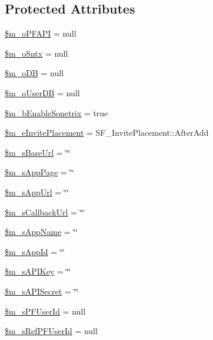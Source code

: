 \subsection*{Protected Attributes}
\begin{DoxyCompactItemize}
\item 
\hyperlink{classSF__AppConfig_a23d5b5190ee32c4eb8fff028844b1fa6}{\$m\_\-oPFAPI} = null
\item 
\hyperlink{classSF__AppConfig_a22d1091f94c58e3533304abe3eb9e9fe}{\$m\_\-oSntx} = null
\item 
\hyperlink{classSF__AppConfig_af0fd242fc474881efab473522eec0748}{\$m\_\-oDB} = null
\item 
\hyperlink{classSF__AppConfig_a480a834e33015cc9a001d1d84972bb12}{\$m\_\-oUserDB} = null
\item 
\hyperlink{classSF__AppConfig_a55534a049a693ced372dba4331e5e9bd}{\$m\_\-bEnableSonetrix} = true
\item 
\hyperlink{classSF__AppConfig_a78a5b97e38e7a2bc9e36cca0a97a2cca}{\$m\_\-eInvitePlacement} = SF\_\-InvitePlacement::AfterAdd
\item 
\hyperlink{classSF__AppConfig_a12f1f6a87e26bffa94c2b7e5ea3885c9}{\$m\_\-sBaseUrl} = \char`\"{}\char`\"{}
\item 
\hyperlink{classSF__AppConfig_ae9ca918bbe92c641557f1ee16a082100}{\$m\_\-sAppPage} = \char`\"{}\char`\"{}
\item 
\hyperlink{classSF__AppConfig_ab35950231d123d9279d8b0b3b0878609}{\$m\_\-sAppUrl} = \char`\"{}\char`\"{}
\item 
\hyperlink{classSF__AppConfig_a5c010b1e93c651cf5024339d568fb0d1}{\$m\_\-sCallbackUrl} = \char`\"{}\char`\"{}
\item 
\hyperlink{classSF__AppConfig_a349b224844e6202ccda4da1605f5156b}{\$m\_\-sAppName} = \char`\"{}\char`\"{}
\item 
\hyperlink{classSF__AppConfig_acd79de47be3cc9eb08fa4190b5d8a8bb}{\$m\_\-sAppId} = \char`\"{}\char`\"{}
\item 
\hyperlink{classSF__AppConfig_a47530e961351765a665c4ba63e72ff3d}{\$m\_\-sAPIKey} = \char`\"{}\char`\"{}
\item 
\hyperlink{classSF__AppConfig_ad25b743c1731f4d58b617a193538c2b0}{\$m\_\-sAPISecret} = \char`\"{}\char`\"{}
\item 
\hyperlink{classSF__AppConfig_aca2665de105ba9e1a89b58722bd21f16}{\$m\_\-sPFUserId} = null
\item 
\hyperlink{classSF__AppConfig_ae91a01f7cb3d6446617f9e6cae69533c}{\$m\_\-sRefPFUserId} = null

\end{DoxyCompactItemize}
